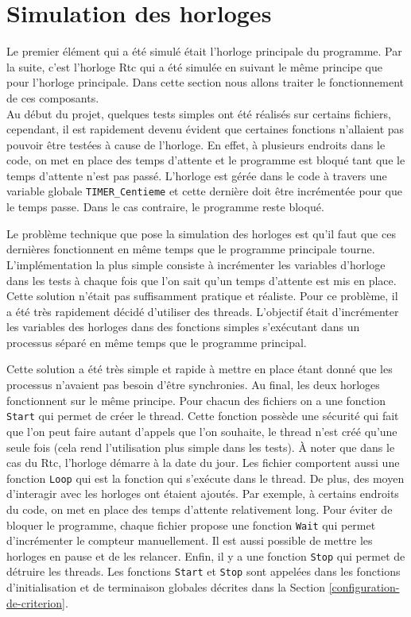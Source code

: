 \documentclass[a4paper]{article}
\begin{document}
\section{Simulation des horloges}%
\label{simuhorologes}

Le premier élément qui a été simulé était l'horloge principale du programme. Par
la suite, c'est l'horloge Rtc qui a été simulée en suivant le même principe que
pour l'horloge principale. Dans cette section nous allons traiter le
fonctionnement de ces composants.\\

Au début du projet, quelques tests simples ont été réalisés sur certains
fichiers, cependant, il est rapidement devenu évident que certaines fonctions
n'allaient pas pouvoir être testées à cause de l'horloge. En effet, à plusieurs
endroits dans le code, on met en place des temps d'attente et le programme est
bloqué tant que le temps d'attente n'est pas passé. L'horloge est gérée dans le
code à travers une variable globale \verb|TIMER_Centieme| et cette dernière
doit être incrémentée pour que le temps passe. Dans le cas contraire, le
programme reste bloqué.

Le problème technique que pose la simulation des horloges est qu'il faut que ces
dernières fonctionnent en même temps que le programme principale tourne.
L'implémentation la plus simple consiste à incrémenter les variables d'horloge
dans les tests à chaque fois que l'on sait qu'un temps d'attente est mis en
place. Cette solution n'était pas suffisamment pratique et réaliste. Pour ce
problème, il a été très rapidement décidé d'utiliser des threads. L'objectif
était d'incrémenter les variables des horloges dans des fonctions simples
s'exécutant dans un processus séparé en même temps que le programme principal.

Cette solution a été très simple et rapide à mettre en place étant donné que les
processus n'avaient pas besoin d'être synchronies. Au final, les deux horloges
fonctionnent sur le même principe. Pour chacun des fichiers on a une fonction
\verb|Start| qui permet de créer le thread. Cette fonction possède une
sécurité qui fait que l'on peut faire autant d'appels que l'on souhaite, le
thread n'est créé qu'une seule fois (cela rend l'utilisation plus simple dans
les tests). À noter que dans le cas du Rtc, l'horloge démarre à la date du jour.
Les fichier comportent aussi une fonction \verb|Loop| qui est la fonction
qui s'exécute dans le thread. De plus, des moyen d'interagir avec les horloges
ont étaient ajoutés. Par exemple, à certains endroits du code, on met en place
des temps d'attente relativement long. Pour éviter de bloquer le programme,
chaque fichier propose une fonction \verb|Wait| qui permet d'incrémenter le
compteur manuellement. Il est aussi possible de mettre les horloges en pause et
de les relancer. Enfin, il y a une fonction \verb|Stop| qui permet de
détruire les threads. Les fonctions \verb|Start| et \verb|Stop| sont
appelées dans les fonctions d'initialisation et de terminaison globales décrites
dans la Section \ref{configuration-de-criterion}.\\
\end{document}
